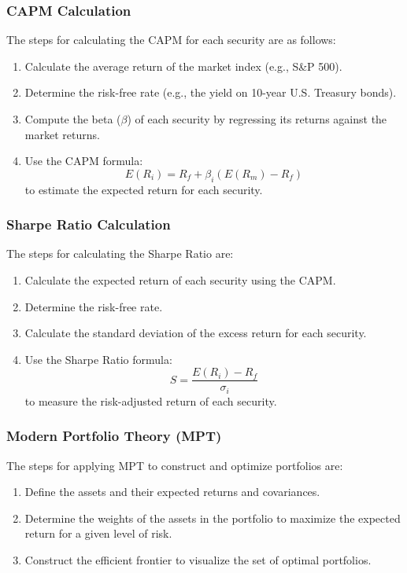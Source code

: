 \subsubsection*{CAPM Calculation}
The steps for calculating the CAPM for each security are as follows:
\begin{enumerate}
    \item Calculate the average return of the market index (e.g., S&P 500).
    \item Determine the risk-free rate (e.g., the yield on 10-year U.S. Treasury bonds).
    \item Compute the beta (\(\beta\)) of each security by regressing its returns against the market returns.
    \item Use the CAPM formula:
    \[ E(R_i) = R_f + \beta_i (E(R_m) - R_f) \]
    to estimate the expected return for each security.
\end{enumerate}

\subsubsection*{Sharpe Ratio Calculation}
The steps for calculating the Sharpe Ratio are:
\begin{enumerate}
    \item Calculate the expected return of each security using the CAPM.
    \item Determine the risk-free rate.
    \item Calculate the standard deviation of the excess return for each security.
    \item Use the Sharpe Ratio formula:
    \[ S = \frac{E(R_i) - R_f}{\sigma_i} \]
    to measure the risk-adjusted return of each security.
\end{enumerate}

\subsubsection*{Modern Portfolio Theory (MPT)}
The steps for applying MPT to construct and optimize portfolios are:
\begin{enumerate}
    \item Define the assets and their expected returns and covariances.
    \item Determine the weights of the assets in the portfolio to maximize the expected return for a given level of risk.
    \item Construct the efficient frontier to visualize the set of optimal portfolios.
\end{enumerate}

